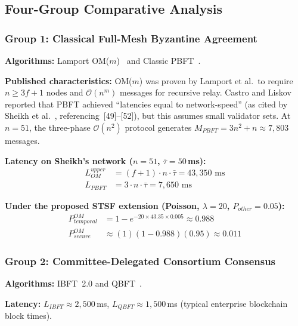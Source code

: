 \documentclass[10pt,twocolumn,letterpaper]{article}
\begin{document}
\subsection{Four-Group Comparative Analysis}
\label{sec:groups}

\subsubsection{Group 1: Classical Full-Mesh Byzantine Agreement}

\textbf{Algorithms:} Lamport OM($m$)~\cite{lamport1982} and Classic PBFT~\cite{castro1999}.

\textbf{Published characteristics:} OM($m$) was proven by Lamport et al.\ to require $n \geq 3f + 1$ nodes and $\mathcal{O}(n^m)$ messages for recursive relay. Castro and Liskov~\cite{castro1999} reported that PBFT achieved ``latencies equal to network-speed'' (as cited by Sheikh et al.~\cite{sheikh2020}, referencing~[49]--[52]), but this assumes small validator sets. At $n = 51$, the three-phase $\mathcal{O}(n^2)$ protocol generates $M_{PBFT} = 3n^2 + n \approx 7{,}803$ messages.

\textbf{Latency on Sheikh's network ($n = 51$, $\bar{\tau} = 50$\,ms):}
\begin{align}
L_{OM}^{upper} &= (f+1) \cdot n \cdot \bar{\tau} = 43{,}350\text{ ms} \\
L_{PBFT} &= 3 \cdot n \cdot \bar{\tau} = 7{,}650\text{ ms}
\end{align}

\textbf{Under the proposed STSF extension (Poisson, $\lambda = 20$, $P_{other} = 0.05$):}
\begin{align}
P_{temporal}^{OM} &= 1 - e^{-20 \times 43.35 \times 0.005} \approx 0.988 \\
P_{secure}^{OM} &\approx (1)(1 - 0.988)(0.95) \approx 0.011
\end{align}

\subsubsection{Group 2: Committee-Delegated Consortium Consensus}

\textbf{Algorithms:} IBFT~2.0 and QBFT~\cite{li2020}.

\textbf{Latency:} $L_{IBFT} \approx 2{,}500$\,ms, $L_{QBFT} \approx 1{,}500$\,ms (typical enterprise blockchain block times).
\end{document}
